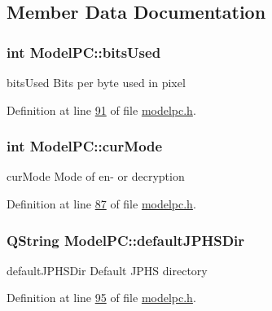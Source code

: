 \subsection{Member Data Documentation}
\hypertarget{class_model_p_c_a655deb6a8afa94c7f4aadb3056989038}{
\subsubsection[{bits\-Used}]{\setlength{\rightskip}{0pt plus 5cm}int Model\-P\-C\-::bits\-Used}}\label{class_model_p_c_a655deb6a8afa94c7f4aadb3056989038}


bits\-Used Bits per byte used in pixel 



Definition at line \hyperlink{modelpc_8h_source_l00091}{91} of file \hyperlink{modelpc_8h_source}{modelpc.\-h}.

\hypertarget{class_model_p_c_ad74974ac236182c1d6d2cf0729fac3dd}{
\subsubsection[{cur\-Mode}]{\setlength{\rightskip}{0pt plus 5cm}int Model\-P\-C\-::cur\-Mode}}\label{class_model_p_c_ad74974ac236182c1d6d2cf0729fac3dd}


cur\-Mode Mode of en-\/ or decryption 



Definition at line \hyperlink{modelpc_8h_source_l00087}{87} of file \hyperlink{modelpc_8h_source}{modelpc.\-h}.

\hypertarget{class_model_p_c_abd038306f14f22fb885a1697c96d6335}{
\subsubsection[{default\-J\-P\-H\-S\-Dir}]{\setlength{\rightskip}{0pt plus 5cm}Q\-String Model\-P\-C\-::default\-J\-P\-H\-S\-Dir}}\label{class_model_p_c_abd038306f14f22fb885a1697c96d6335}


default\-J\-P\-H\-S\-Dir Default J\-P\-H\-S directory 



Definition at line \hyperlink{modelpc_8h_source_l00095}{95} of file \hyperlink{modelpc_8h_source}{modelpc.\-h}.

